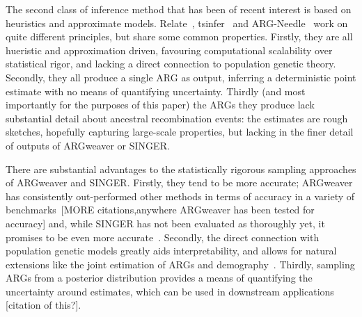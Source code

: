 \documentclass{article}
\begin{document}
The second class of inference method that has been of recent interest 
is based on heuristics and approximate models.
Relate~\citep{speidel_method_2019},
tsinfer~\citep{kelleher_inferring_2019} and 
ARG-Needle~\citep{zhang_biobank-scale_2023} work on quite different 
principles, but share some common properties. Firstly, they are all 
hueristic and approximation driven, favouring computational
scalability over statistical rigor, and lacking a direct 
connection to population genetic theory. 
Secondly, they all produce a single
ARG as output, inferring a deterministic point estimate with no means 
of quantifying uncertainty. Thirdly (and most importantly for the 
purposes of this paper) the ARGs they produce lack substantial
detail about ancestral recombination events: the estimates are
rough sketches, hopefully capturing large-scale properties, but lacking
in the finer detail of outputs of ARGweaver or SINGER. 

There are substantial advantages to the statistically rigorous sampling 
approaches of ARGweaver and SINGER. Firstly, they tend to be more 
accurate; ARGweaver has consistently out-performed other methods in terms 
of accuracy in a variety of benchmarks~\citep{brandt2022evaluation}[MORE
citations,anywhere ARGweaver has been tested for accuracy]
and, while SINGER has not been evaluated as thoroughly yet, it promises
to be even more accurate~\citep{deng_robust_2024}. 
Secondly, the direct connection with
population genetic models greatly aids interpretability, and allows for
natural extensions like the joint estimation of ARGs and
demography~\citep{hubisz_mapping_2020}. Thirdly, sampling ARGs from a
posterior distribution provides a means of quantifying the uncertainty 
around estimates, which can be used in downstream applications [citation
of this?]. 
\end{document}

